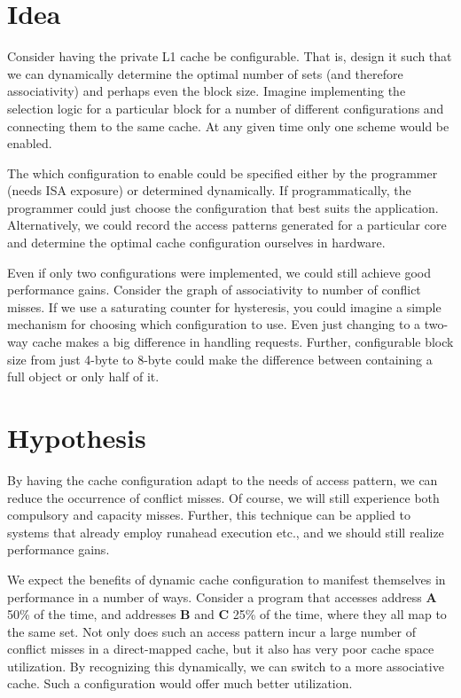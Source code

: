 \documentclass[pageno]{jpaper}
\begin{document}
\section{Idea}
Consider having the private L1 cache be configurable. That is, design it such that we can dynamically determine the optimal number of sets (and therefore associativity) and perhaps even the block size. Imagine implementing the selection logic for a particular block for a number of different configurations and connecting them to the same cache. At any given time only one scheme would be enabled.

The which configuration to enable could be specified either by the programmer (needs ISA exposure) or determined dynamically. If programmatically, the programmer could just choose the configuration that best suits the application. Alternatively, we could record the access patterns generated for a particular core and determine the optimal cache configuration ourselves in hardware.

Even if only two configurations were implemented, we could still achieve good performance gains.  Consider the graph of associativity to number of conflict misses. If we use a saturating counter for hysteresis, you could imagine a simple mechanism for choosing which configuration to use. Even just changing to a two-way cache makes a big difference in handling requests. Further, configurable block size from just 4-byte to 8-byte could make the difference between containing a full object or only half of it.


\section{Hypothesis}
By having the cache configuration adapt to the needs of access pattern, we can reduce the occurrence of conflict misses. Of course, we will still experience both compulsory and capacity misses. Further, this technique can be applied to systems that already employ runahead execution etc., and we should still realize performance gains.

We expect the benefits of dynamic cache configuration to manifest themselves in performance in a number of ways. Consider a program that accesses address \textbf{A} 50\% of the time, and addresses \textbf{B} and \textbf{C} 25\% of the time, where they all map to the same set. Not only does such an access pattern incur a large number of conflict misses in a direct-mapped cache, but it also has very poor cache space utilization. By recognizing this dynamically, we can switch to a more associative cache. Such a configuration would offer much better utilization.
\end{document}
